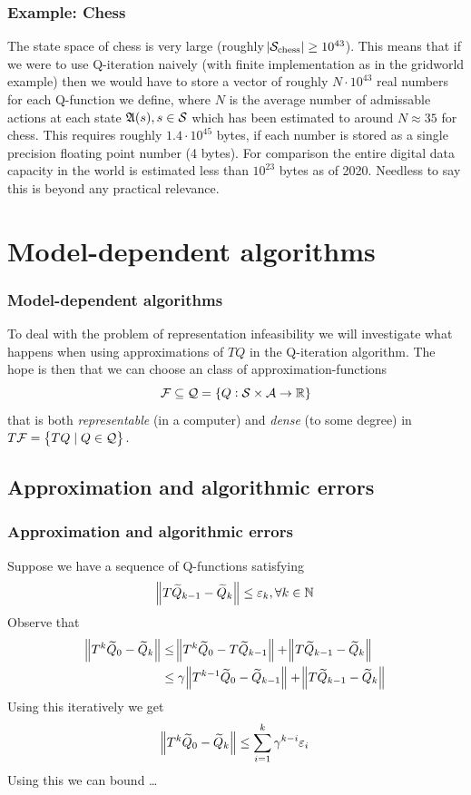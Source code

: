 \documentclass{beamer}[10]
\begin{document}
\begin{frame}
  \frametitle{Example: Chess}
  The state space of chess is very large
  (roughly $\abs{\mathcal{S}_{\mathrm{chess}}} \geq 10^{43}$).
  This means that if we were to use Q-iteration naively
  (with finite implementation as in the gridworld example)
  then we would have to store a vector of
  roughly $N \cdot 10^{43}$ real numbers for each Q-function we define,
  where $N$ is the average number of admissable actions at each state
  $\frak{A}(s), s \in \mathcal{S}$
  which has been estimated to around $N \approx 35$ for chess.
  This requires roughly $1.4 \cdot 10^{45}$ bytes, if each number is stored as a
  single precision floating point number (4 bytes).
  For comparison the entire digital data capacity in the world is estimated
  less than $10^{23}$ bytes as of 2020.
  Needless to say this is beyond any practical relevance.
\end{frame}
\section{Model-dependent algorithms}

\begin{frame}
  \frametitle{Model-dependent algorithms}
  To deal with the problem of representation infeasibility we will investigate
  what happens when using approximations of $TQ$ in the Q-iteration algorithm.
  The hope is then that we can choose an class of approximation-functions
  \[ \mathcal{F} \subseteq \mathcal{Q} = \{ Q : \mathcal{S} \times \mathcal{A} \to \mathbb{R} \} \]
  that is both \emph{representable} (in a computer) and \emph{dense}
  (to some degree) in $T \mathcal{F} = \left\{ TQ \mid Q \in \mathcal{Q} \right\}$.
\end{frame}

\subsection{Approximation and algorithmic errors}

\begin{frame}
  \frametitle{Approximation and algorithmic errors}
  Suppose we have a sequence of Q-functions satisfying
  \begin{equation*}
    \norm{T\widetilde{Q}_{k-1} - \widetilde{Q}_k} \leq \varepsilon_k, \forall k \in \mathbb{N}
    \label{eq:defnvei}
  \end{equation*}
  Observe that
  \begin{align*}
    \norm{T^k \widetilde{Q}_0 - \widetilde{Q}_k}
    &\leq \norm{T^k \widetilde{Q}_0 - T \widetilde{Q}_{k-1}} + \norm{T\widetilde{Q}_{k-1} - \widetilde{Q}_k}
    \\ &\leq \gamma \norm{T^{k-1} \widetilde{Q}_0 - \widetilde{Q}_{k-1}}
    + \norm{T\widetilde{Q}_{k-1} - \widetilde{Q}_k}
  \end{align*}
  Using this iteratively we get
  \begin{equation*}
    \norm{T^k \widetilde{Q}_0 - \widetilde{Q}_k} \leq \sum_{i=1}^k \gamma^{k-i} \varepsilon_i
  \end{equation*}
  Using this we can bound \ldots
\end{frame}
\end{document}
